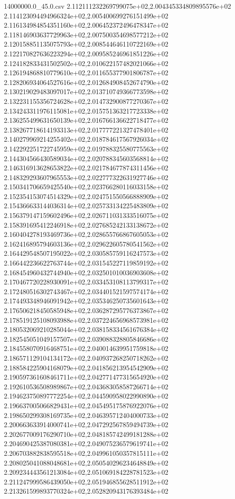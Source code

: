 \begin{filecontents*}{14000000.0_45.0.csv}
2.112111232269799075e+02,2.004345334809895576e+02
2.114123094494966324e+02,2.005400699276151499e+02
2.116134984854351160e+02,2.006452372496478347e+02
2.118146903637729963e+02,2.007500354698577212e+02
2.120158851135075793e+02,2.008544646110722169e+02
2.122170827636223294e+02,2.009585246961851226e+02
2.124182833431502502e+02,2.010622157482021066e+02
2.126194868810779610e+02,2.011655377901806787e+02
2.128206934064527616e+02,2.012684908452674790e+02
2.130219029483097017e+02,2.013710749366773598e+02
2.132231155356724628e+02,2.014732900877270367e+02
2.134243311976115081e+02,2.015751363217723338e+02
2.136255499631650139e+02,2.016766136622718477e+02
2.138267718614193313e+02,2.017777221327478401e+02
2.140279969214255402e+02,2.018784617567926034e+02
2.142292251722745959e+02,2.019788325580775563e+02
2.144304566430589034e+02,2.020788345603568814e+02
2.146316913628653822e+02,2.021784677874311456e+02
2.148329293607965553e+02,2.022777322631927746e+02
2.150341706659425540e+02,2.023766280116033158e+02
2.152354153074514329e+02,2.024751550566888909e+02
2.154366633144036314e+02,2.025733134225483809e+02
2.156379147159602496e+02,2.026711031333516075e+02
2.158391695412246918e+02,2.027685242133138672e+02
2.160404278193469736e+02,2.028655766867605053e+02
2.162416895794603136e+02,2.029622605780541562e+02
2.164429548507195022e+02,2.030585759116247573e+02
2.166442236622763744e+02,2.031545227119859192e+02
2.168454960432744940e+02,2.032501010036903608e+02
2.170467720228930091e+02,2.033453108113799317e+02
2.172480516302743467e+02,2.034401521597574174e+02
2.174493348946091942e+02,2.035346250735601643e+02
2.176506218450585948e+02,2.036287295776373867e+02
2.178519125108093988e+02,2.037224656968573981e+02
2.180532069210285044e+02,2.038158334561676384e+02
2.182545051049157507e+02,2.039088328805846686e+02
2.184558070916468751e+02,2.040014639951759818e+02
2.186571129104134172e+02,2.040937268250718262e+02
2.188584225904168079e+02,2.041856213954542909e+02
2.190597361608461711e+02,2.042771477315654920e+02
2.192610536508989867e+02,2.043683058587266714e+02
2.194623750897772254e+02,2.044590958022990890e+02
2.196637005066829431e+02,2.045495175876922076e+02
2.198650299308169735e+02,2.046395712404000733e+02
2.200663633914000741e+02,2.047292567859494739e+02
2.202677009176290710e+02,2.048185742499181288e+02
2.204690425387080381e+02,2.049075236579619741e+02
2.206703882838595518e+02,2.049961050357815111e+02
2.208025041088048681e+02,2.050540296234648849e+02
2.209234443561213084e+02,2.051069184228781523e+02
2.211247999586439050e+02,2.051946855628511912e+02
2.213261599893770324e+02,2.052820943176393484e+02

\end{filecontents*}
